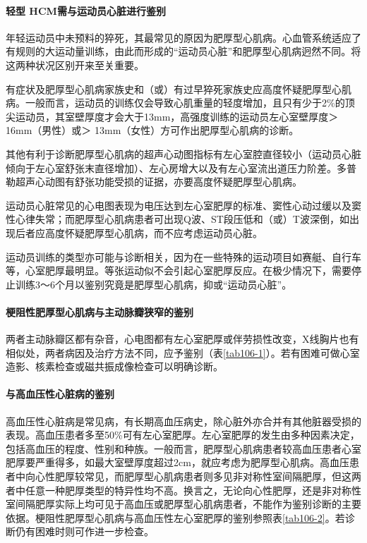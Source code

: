 \paragraph{轻型 HCM需与运动员心脏进行鉴别}

年轻运动员中未预料的猝死，其最常见的原因为肥厚型心肌病。心血管系统适应了有规则的大运动量训练，由此而形成的“运动员心脏”和肥厚型心肌病迥然不同。将这两种状况区别开来至关重要。

有症状及肥厚型心肌病家族史和（或）有过早猝死家族史应高度怀疑肥厚型心肌病。一般而言，运动员的训练仅会导致心肌重量的轻度增加，且只有少于2\%的顶尖运动员，其室壁厚度才会大于13mm，高强度训练的运动员左心室壁厚度＞
16mm（男性）或＞ 13mm（女性）方可作出肥厚型心肌病的诊断。

其他有利于诊断肥厚型心肌病的超声心动图指标有左心室腔直径较小（运动员心脏倾向于左心室舒张末直径增加）、左心房增大以及有左心室流出道压力阶差。多普勒超声心动图有舒张功能受损的证据，亦要高度怀疑肥厚型心肌病。

运动员心脏常见的心电图表现为电压达到左心室肥厚的标准、窦性心动过缓以及窦性心律失常；而肥厚型心肌病患者可出现Q波、ST段压低和（或）T波深倒，如出现后者应高度怀疑肥厚型心肌病，而不应考虑运动员心脏。

运动员训练的类型亦可能与诊断相关，因为在一些特殊的运动项目如赛艇、自行车等，心室肥厚最明显。等张运动似不会引起心室肥厚反应。在极少情况下，需要停止训练3～6个月以鉴别究竟是肥厚型心肌病，抑或“运动员心脏”。

\paragraph{梗阻性肥厚型心肌病与主动脉瓣狭窄的鉴别}

两者主动脉瓣区都有杂音，心电图都有左心室肥厚或伴劳损性改变，X线胸片也有相似处，两者病因及治疗方法不同，应予鉴别（表\ref{tab106-1}）。若有困难可做心室造影、核素检查或磁共振成像检查可以明确诊断。

\paragraph{与高血压性心脏病的鉴别}

高血压性心脏病是常见病，有长期高血压病史，除心脏外亦合并有其他脏器受损的表现。高血压患者多至50\%可有左心室肥厚。左心室肥厚的发生由多种因素决定，包括高血压的程度、性别和种族。一般而言，肥厚型心肌病患者较高血压患者心室肥厚要严重得多，如最大室壁厚度超过2cm，就应考虑为肥厚型心肌病。高血压患者中向心性肥厚较常见，而肥厚型心肌病患者则多见非对称性室间隔肥厚，但这两者中任意一种肥厚类型的特异性均不高。换言之，无论向心性肥厚，还是非对称性室间隔肥厚实际上均可见于高血压或肥厚型心肌病患者，不能作为鉴别诊断的主要依据。梗阻性肥厚型心肌病与高血压性左心室肥厚的鉴别参照表\ref{tab106-2}。若诊断仍有困难时则可作进一步检查。


